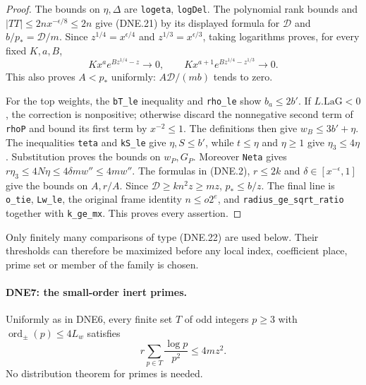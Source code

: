 \begin{proof}
The bounds on $\eta,\Delta$ are \texttt{logeta}, \texttt{logDel}.
The polynomial rank bounds and $|TT|\le2n x^{-\epsilon/8}\le2n$
give (DNE.21) by its displayed formula for $\mathcal D$ and
$b/p_*=\mathcal D/m$.
Since $z^{1/4}=x^{\epsilon/4}$ and
$z^{1/3}=x^{\epsilon/3}$, taking logarithms proves, for every
fixed $K,a,B$,
\[
 Kx^a e^{Bz^{1/4}-z}\longrightarrow0,
 \qquad Kx^{a+1}e^{Bz^{1/4}-z^{1/3}}\longrightarrow0.     \tag{DNE.22}
\]
This also proves $A<p_*$ uniformly: $A\mathcal D/(mb)$ tends to zero.

For the top weights, the \texttt{bT\_le} inequality and
\texttt{rho\_le} show $b_a\le2b'$.  If $L.\mathrm{LaG}<0$,
the correction is nonpositive; otherwise discard the nonnegative
second term of \texttt{rhoP} and bound its first term by
$x^{-2}\le1$.  The definitions then give $w_B\le3b'+\eta$.
The inequalities \texttt{teta} and \texttt{kS\_le} give
$\eta,S\le b'$, while $t\le\eta$ and $\eta\ge1$ give
$\eta_3\le4\eta$.  Substitution proves the bounds on $w_P,G_P$.
Moreover \texttt{Neta} gives
$r\eta_3\le4N\eta\le4\delta m w''\le4m w''$.
The formulas in (DNE.2), $r\le2k$ and
$\delta\in[x^{-\epsilon},1]$ give the bounds on $A,r/A$.
Since $\mathcal D\ge kn^2z\ge mz$, $p_*\le b/z$.
The final line is \texttt{o\_tie}, \texttt{Lw\_le}, the original
frame identity $n\le o2^e$, and \texttt{radius\_ge\_sqrt\_ratio}
together with \texttt{k\_ge\_mx}.  This proves every assertion.
\end{proof}

Only finitely many comparisons of type (DNE.22) are used below.
Their thresholds can therefore be maximized before any local index,
coefficient place, prime set or member of the family is chosen.

\paragraph{DNE7: the small-order inert primes.}
\label{claim:DNE7}
Uniformly as in DNE6, every finite set $T$ of odd integers $p\ge3$
with $\operatorname{ord}_{\pm}(p)\le4L_w$ satisfies
\[
           r\sum_{p\in T}\frac{\log p}{p^2}\le4mz^2.     \tag{DNE.23}
\]
No distribution theorem for primes is needed.

